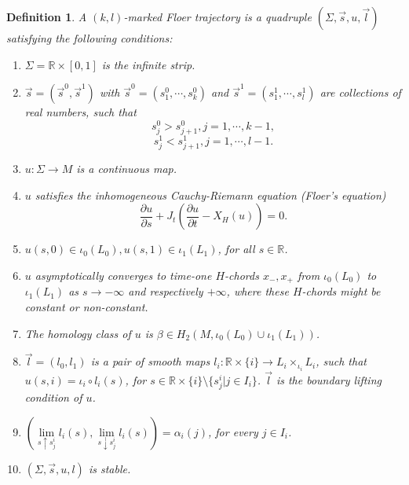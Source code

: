 \documentclass{amsart}
\newtheorem{definition}[theorem]{Definition}
\numberwithin{equation}{section}
\numberwithin{figure}{section}
\begin{document}
\begin{definition}
	A $(k, l)$-marked Floer trajectory is a quadruple $(\Sigma, \vec{s}, u, \vec{l})$ satisfying the following conditions:
\begin{enumerate}[label=(\roman*)]

\item $\Sigma = \mathbb{R} \times [0, 1]$ is the infinite strip.

\item $\vec{s} = (\vec{s}^{0}, \vec{s}^{1})$ with $\vec{s}^{0} = (s^{0}_{1}, \cdots, s^{0}_{k})$ and $\vec{s}^{1} = (s^{1}_{1}, \cdots, s^{1}_{l})$ are collections of real numbers, such that 
\begin{equation*}
s^{0}_{j} > s^{0}_{j+1}, j = 1, \cdots, k-1,
\end{equation*}
\begin{equation*}
s^{1}_{j} < s^{1}_{j+1}, j = 1, \cdots, l-1.
\end{equation*}

\item $u: \Sigma \to M$ is a continuous map.

\item $u$ satisfies the inhomogeneous Cauchy-Riemann equation (Floer's equation)
\begin{equation*}
\frac{\partial u}{\partial s} + J_{t}(\frac{\partial u}{\partial t} - X_{H}(u)) = 0.
\end{equation*}

\item $u(s, 0) \in \iota_{0}(L_{0}), u(s, 1) \in \iota_{1}(L_{1})$, for all $s \in \mathbb{R}$.

\item $u$ asymptotically converges to time-one $H$-chords $x_{-}, x_{+}$ from $\iota_{0}(L_{0})$ to $\iota_{1}(L_{1})$ as $s \to - \infty$ and respectively $+\infty$, where these $H$-chords might be constant or non-constant.

\item The homology class of $u$ is $\beta \in H_{2}(M, \iota_{0}(L_{0}) \cup \iota_{1}(L_{1}))$.

\item $\vec{l} = (l_{0}, l_{1})$ is a pair of smooth maps $l_{i}:  \mathbb{R} \times \{i\} \to L_{i} \times_{\iota_{i}} L_{i}$, such that $u(s, i) = \iota_{i} \circ l_{i}(s)$, for $s \in \mathbb{R} \times \{i\} \setminus \{s^{i}_{j}| j \in I_{i}\}$. $\vec{l}$ is the boundary lifting condition of $u$.

\item $(\lim\limits_{s \uparrow s^{i}_{j}} l_{i}(s), \lim\limits_{s \downarrow s^{i}_{j}} l_{i}(s)) = \alpha_{i}(j)$, for every $j \in I_{i}$.

\item $(\Sigma, \vec{s}, u, l)$ is stable.

\end{enumerate} \par

\end{definition}
\end{document}
